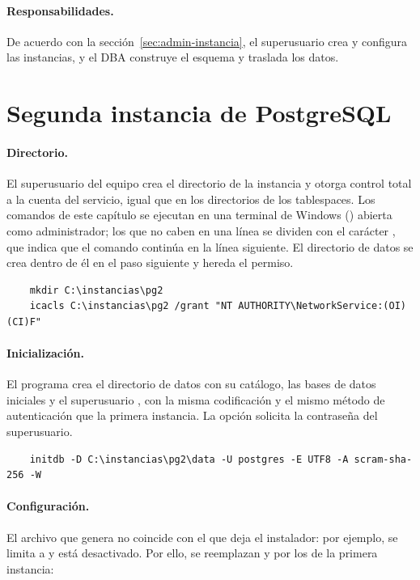 \paragraph{Responsabilidades.} De acuerdo con la sección~\ref{sec:admin-instancia}, el superusuario crea y configura las instancias, y el DBA construye el esquema y traslada los datos.

\section{Segunda instancia de PostgreSQL}

\paragraph{Directorio.} El superusuario del equipo crea el directorio de la instancia y otorga control total a la cuenta del servicio, igual que en los directorios de los tablespaces. Los comandos de este capítulo se ejecutan en una terminal de Windows () abierta como administrador; los que no caben en una línea se dividen con el carácter \nem{\textasciicircum}, que indica que el comando continúa en la línea siguiente. El directorio de datos se crea dentro de él en el paso siguiente y hereda el permiso.

\begin{verbatim}
	mkdir C:\instancias\pg2
	icacls C:\instancias\pg2 /grant "NT AUTHORITY\NetworkService:(OI)(CI)F"
\end{verbatim}

\paragraph{Inicialización.} El programa  crea el directorio de datos con su catálogo, las bases de datos iniciales y el superusuario , con la misma codificación y el mismo método de autenticación que la primera instancia. La opción  solicita la contraseña del superusuario.

\begin{verbatim}
	initdb -D C:\instancias\pg2\data -U postgres -E UTF8 -A scram-sha-256 -W
\end{verbatim}

\paragraph{Configuración.} El archivo  que genera  no coincide con el que deja el instalador: por ejemplo,  se limita a  y  está desactivado. Por ello, se reemplazan  y  por los de la primera instancia:

